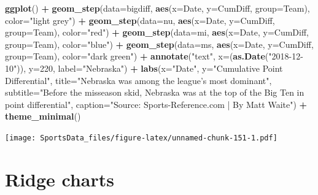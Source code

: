 \documentclass[]{book}
\newenvironment{Shaded}{\begin{snugshade}}{\end{snugshade}}
\newcommand{\KeywordTok}[1]{\textcolor[rgb]{0.13,0.29,0.53}{\textbf{#1}}}
\newcommand{\DataTypeTok}[1]{\textcolor[rgb]{0.13,0.29,0.53}{#1}}
\newcommand{\DecValTok}[1]{\textcolor[rgb]{0.00,0.00,0.81}{#1}}
\newcommand{\StringTok}[1]{\textcolor[rgb]{0.31,0.60,0.02}{#1}}
\newcommand{\OperatorTok}[1]{\textcolor[rgb]{0.81,0.36,0.00}{\textbf{#1}}}
\newcommand{\NormalTok}[1]{#1}
\begin{document}
\begin{Shaded}
\begin{Highlighting}[]
\KeywordTok{ggplot}\NormalTok{() }\OperatorTok{+}\StringTok{ }
\StringTok{  }\KeywordTok{geom_step}\NormalTok{(}\DataTypeTok{data=}\NormalTok{bigdiff, }\KeywordTok{aes}\NormalTok{(}\DataTypeTok{x=}\NormalTok{Date, }\DataTypeTok{y=}\NormalTok{CumDiff, }\DataTypeTok{group=}\NormalTok{Team), }\DataTypeTok{color=}\StringTok{"light grey"}\NormalTok{) }\OperatorTok{+}
\StringTok{  }\KeywordTok{geom_step}\NormalTok{(}\DataTypeTok{data=}\NormalTok{nu, }\KeywordTok{aes}\NormalTok{(}\DataTypeTok{x=}\NormalTok{Date, }\DataTypeTok{y=}\NormalTok{CumDiff, }\DataTypeTok{group=}\NormalTok{Team), }\DataTypeTok{color=}\StringTok{"red"}\NormalTok{) }\OperatorTok{+}\StringTok{ }
\StringTok{  }\KeywordTok{geom_step}\NormalTok{(}\DataTypeTok{data=}\NormalTok{mi, }\KeywordTok{aes}\NormalTok{(}\DataTypeTok{x=}\NormalTok{Date, }\DataTypeTok{y=}\NormalTok{CumDiff, }\DataTypeTok{group=}\NormalTok{Team), }\DataTypeTok{color=}\StringTok{"blue"}\NormalTok{) }\OperatorTok{+}\StringTok{ }
\StringTok{  }\KeywordTok{geom_step}\NormalTok{(}\DataTypeTok{data=}\NormalTok{ms, }\KeywordTok{aes}\NormalTok{(}\DataTypeTok{x=}\NormalTok{Date, }\DataTypeTok{y=}\NormalTok{CumDiff, }\DataTypeTok{group=}\NormalTok{Team), }\DataTypeTok{color=}\StringTok{"dark green"}\NormalTok{) }\OperatorTok{+}
\StringTok{  }\KeywordTok{annotate}\NormalTok{(}\StringTok{"text"}\NormalTok{, }\DataTypeTok{x=}\NormalTok{(}\KeywordTok{as.Date}\NormalTok{(}\StringTok{"2018-12-10"}\NormalTok{)), }\DataTypeTok{y=}\DecValTok{220}\NormalTok{, }\DataTypeTok{label=}\StringTok{"Nebraska"}\NormalTok{) }\OperatorTok{+}
\StringTok{  }\KeywordTok{labs}\NormalTok{(}\DataTypeTok{x=}\StringTok{"Date"}\NormalTok{, }\DataTypeTok{y=}\StringTok{"Cumulative Point Differential"}\NormalTok{, }\DataTypeTok{title=}\StringTok{"Nebraska was among the league's most dominant"}\NormalTok{, }\DataTypeTok{subtitle=}\StringTok{"Before the misseason skid, Nebraska was at the top of the Big Ten in point differential"}\NormalTok{, }\DataTypeTok{caption=}\StringTok{"Source: Sports-Reference.com | By Matt Waite"}\NormalTok{) }\OperatorTok{+}
\StringTok{  }\KeywordTok{theme_minimal}\NormalTok{()}
\end{Highlighting}
\end{Shaded}

\texttt{[image: SportsData\_files/figure-latex/unnamed-chunk-151-1.pdf]}

\chapter{Ridge charts}\label{ridge-charts}
\end{document}
